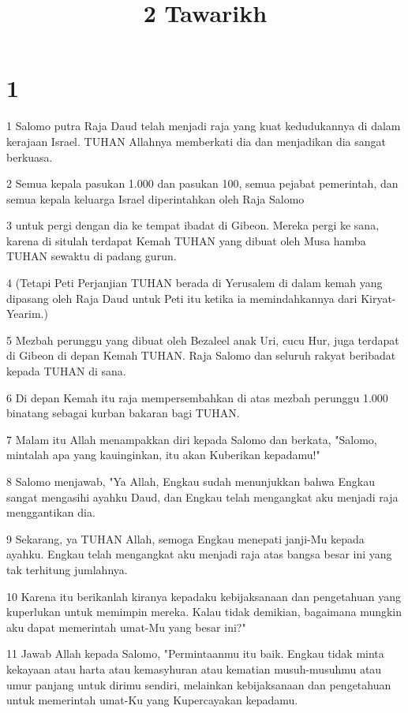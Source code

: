 

\title{2 Tawarikh}


\chapter{1}

\par 1 Salomo putra Raja Daud telah menjadi raja yang kuat kedudukannya di dalam kerajaan Israel. TUHAN Allahnya memberkati dia dan menjadikan dia sangat berkuasa.
\par 2 Semua kepala pasukan 1.000 dan pasukan 100, semua pejabat pemerintah, dan semua kepala keluarga Israel diperintahkan oleh Raja Salomo
\par 3 untuk pergi dengan dia ke tempat ibadat di Gibeon. Mereka pergi ke sana, karena di situlah terdapat Kemah TUHAN yang dibuat oleh Musa hamba TUHAN sewaktu di padang gurun.
\par 4 (Tetapi Peti Perjanjian TUHAN berada di Yerusalem di dalam kemah yang dipasang oleh Raja Daud untuk Peti itu ketika ia memindahkannya dari Kiryat-Yearim.)
\par 5 Mezbah perunggu yang dibuat oleh Bezaleel anak Uri, cucu Hur, juga terdapat di Gibeon di depan Kemah TUHAN. Raja Salomo dan seluruh rakyat beribadat kepada TUHAN di sana.
\par 6 Di depan Kemah itu raja mempersembahkan di atas mezbah perunggu 1.000 binatang sebagai kurban bakaran bagi TUHAN.
\par 7 Malam itu Allah menampakkan diri kepada Salomo dan berkata, "Salomo, mintalah apa yang kauinginkan, itu akan Kuberikan kepadamu!"
\par 8 Salomo menjawab, "Ya Allah, Engkau sudah menunjukkan bahwa Engkau sangat mengasihi ayahku Daud, dan Engkau telah mengangkat aku menjadi raja menggantikan dia.
\par 9 Sekarang, ya TUHAN Allah, semoga Engkau menepati janji-Mu kepada ayahku. Engkau telah mengangkat aku menjadi raja atas bangsa besar ini yang tak terhitung jumlahnya.
\par 10 Karena itu berikanlah kiranya kepadaku kebijaksanaan dan pengetahuan yang kuperlukan untuk memimpin mereka. Kalau tidak demikian, bagaimana mungkin aku dapat memerintah umat-Mu yang besar ini?"
\par 11 Jawab Allah kepada Salomo, "Permintaanmu itu baik. Engkau tidak minta kekayaan atau harta atau kemasyhuran atau kematian musuh-musuhmu atau umur panjang untuk dirimu sendiri, melainkan kebijaksanaan dan pengetahuan untuk memerintah umat-Ku yang Kupercayakan kepadamu.
